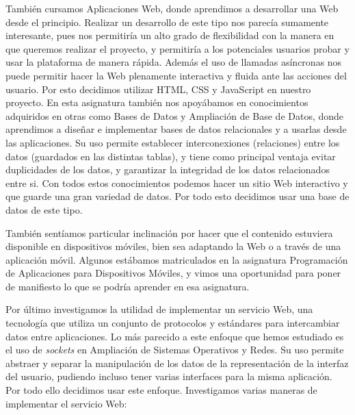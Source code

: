 \vspace{1em}
También cursamos Aplicaciones Web, donde aprendimos a desarrollar una Web desde el principio. Realizar un desarrollo de este tipo nos parecía sumamente interesante, pues nos permitiría un alto grado de flexibilidad con la manera en que queremos realizar el proyecto, y permitiría a los potenciales usuarios probar y usar la plataforma de manera rápida. Además el uso de llamadas asíncronas nos puede permitir hacer la Web plenamente interactiva y fluida ante las acciones del usuario. Por esto decidimos utilizar HTML, CSS y JavaScript en nuestro proyecto. En esta asignatura también nos apoyábamos en conocimientos adquiridos en otras como Bases de Datos y Ampliación de Base de Datos, donde aprendimos a diseñar e implementar bases de datos relacionales y a usarlas desde las aplicaciones. Su uso permite establecer interconexiones (relaciones) entre los datos (guardados en las distintas tablas), y tiene como principal ventaja evitar duplicidades de los datos, y garantizar la integridad de los datos relacionados entre si. Con todos estos conocimientos podemos hacer un sitio Web interactivo y que guarde una gran variedad de datos. Por todo esto decidimos usar una base de datos de este tipo.
\vspace{1em}

También sentíamos particular inclinación por hacer que el contenido estuviera disponible en dispositivos móviles, bien sea adaptando la Web o a través de una aplicación móvil. Algunos estábamos matriculados en la asignatura Programación de Aplicaciones para Dispositivos Móviles, y vimos una oportunidad para poner de manifiesto lo que se podría aprender en esa asignatura.
\vspace{1em}

Por último investigamos la utilidad de implementar un servicio Web, una tecnología que utiliza un conjunto de protocolos y estándares para intercambiar datos entre aplicaciones. Lo más parecido a este enfoque que hemos estudiado es el uso de \emph{sockets} en Ampliación de Sistemas Operativos y Redes. Su uso permite abstraer y separar la manipulación de los datos de la representación de la interfaz del usuario, pudiendo incluso tener varias interfaces para la misma aplicación. Por todo ello decidimos usar este enfoque. Investigamos varias maneras de implementar el servicio Web:

